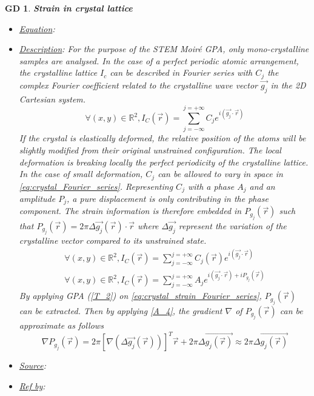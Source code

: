 \documentclass[12pt]{article}
\newtheorem{GD}{GD}
\begin{document}
\begin{GD}
\normalfont \textbf{Strain in crystal lattice}
\begin{itemize}
\item \underline{Equation}: 
\item \underline{Description}: For the purpose of the STEM Moir{\'e} GPA, only mono-crystalline samples are analysed. In the case of a perfect periodic atomic arrangement, the crystalline lattice $I_c$ can be described in Fourier series with $C_j$ the complex Fourier coefficient related to the crystalline wave vector $\vec{g_j}$ in the 2D Cartesian system.
\begin{equation}
\forall (x,y) \in \mathbb{R}^{2},I_C(\vec{r})=\sum_{j=-\infty}^{j=+\infty}C_je^{i(\vec{g_j}\cdot\vec{r})}
\label{eq:crystal_Fourier_series}
\end{equation}
If the crystal is elastically deformed, the relative position of the atoms will be slightly modified from their original unstrained configuration. The local deformation is breaking locally the perfect periodicity of the crystalline lattice. In the case of small deformation, $C_j$ can be allowed to vary in space in \cref{eq:crystal_Fourier_series}. Representing $C_j$ with a phase $A_j$ and an amplitude $P_j$, a pure displacement is only contributing in the phase component. The strain information is therefore embedded in $P_{g_{j}}(\vec{r})$ such that $P_{g_{j}}(\vec{r})=2\pi\Delta \overrightarrow{g_{j}}(\vec{r})\cdot\vec{r}$ where $\Delta \overrightarrow{g_j}$ represent the variation of the crystalline vector compared to its unstrained state.
\begin{equation}
\begin{gathered}
\forall (x,y) \in \mathbb{R}^{2},I_C(\vec{r})=\sum_{j=-\infty}^{j=+\infty}C_j(\vec{r})e^{i(\vec{g_j}\cdot\vec{r})} \\
\forall (x,y) \in \mathbb{R}^{2},I_C(\vec{r})=\sum_{j=-\infty}^{j=+\infty}A_je^{i(\vec{g_j}\cdot\vec{r})+iP_{g_{j}}(\vec{r})}
\end{gathered}
\label{eq:crystal_strain_Fourier_series}
\end{equation}
By applying GPA (\cref{T_2}) on \cref{eq:crystal_strain_Fourier_series}, $P_{g_{j}}(\vec{r})$ can be extracted. Then by applying \cref{A_4}, the gradient $\nabla$ of $P_{g_{j}}(\vec{r})$ can be approximate as follows
\begin{equation}
\nabla P_{g_{j}}(\vec{r}) = 2\pi [\nabla( \Delta \overrightarrow{g_j}(\vec{r}))]^T\vec{r}  + 2\pi\Delta \overrightarrow{g_j(\vec{r})} \approx 2\pi\Delta \overrightarrow{g_j(\vec{r})}
\label{eq:Strain_GPA}
\end{equation}
\item \underline{Source}: \cite{Hytch1998}
\item \underline{Ref by}:
\end{itemize}
\label{GD_1}
\end{GD}
\end{document}
